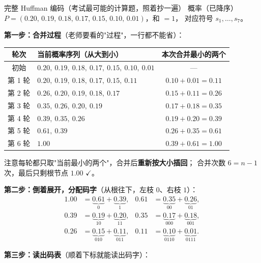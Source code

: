 \begin{calc}{完整 Huffman 编码（考试最可能的计算题，照着抄一遍）}
概率（已降序）$P=(0.20,\,0.19,\,0.18,\,0.17,\,0.15,\,0.10,\,0.01)$，和 $=1$，
对应符号 $s_1,\dots,s_7$。

\textbf{第一步：合并过程}（老师要看的"过程"，一行都不能省）：

\begin{center}
\begin{tabular}{@{}clc@{}}
\toprule
轮次 & 当前概率序列（从大到小） & 本次合并最小的两个\\
\midrule
初始 & $0.20,\ 0.19,\ 0.18,\ 0.17,\ 0.15,\ 0.10,\ 0.01$ & ---\\
第 1 轮 & $0.20,\ 0.19,\ 0.18,\ 0.17,\ 0.15,\ \mathbf{0.11}$ & $0.10+0.01=0.11$\\
第 2 轮 & $0.26,\ 0.20,\ 0.19,\ 0.18,\ \mathbf{0.17}$ & $0.15+0.11=0.26$\\
第 3 轮 & $0.35,\ 0.26,\ 0.20,\ \mathbf{0.19}$ & $0.17+0.18=0.35$\\
第 4 轮 & $0.39,\ 0.35,\ \mathbf{0.26}$ & $0.19+0.20=0.39$\\
第 5 轮 & $0.61,\ \mathbf{0.39}$ & $0.26+0.35=0.61$\\
第 6 轮 & $\mathbf{1.00}$ & $0.39+0.61=1.00$\\
\bottomrule
\end{tabular}
\end{center}

注意每轮都只取"当前最小的两个"，合并后\textbf{重新按大小插回}；
合并次数 $6=n-1$ 次，最后只剩根节点 $1.00$ $\checkmark$。

\textbf{第二步：倒着展开，分配码字}（从根往下，左枝 $0$、右枝 $1$）：
\begin{align*}
1.00&=\underbrace{0.61}_{0}+\underbrace{0.39}_{1}, &
0.61&=\underbrace{0.35}_{00}+\underbrace{0.26}_{01},\\
0.39&=\underbrace{0.19}_{10}+\underbrace{0.20}_{11}, &
0.35&=\underbrace{0.17}_{000}+\underbrace{0.18}_{001},\\
0.26&=\underbrace{0.15}_{010}+\underbrace{0.11}_{011}, &
0.11&=\underbrace{0.10}_{0110}+\underbrace{0.01}_{0111}.
\end{align*}

\textbf{第三步：读出码表}（顺着下标就能读出码字）：


\end{calc}
